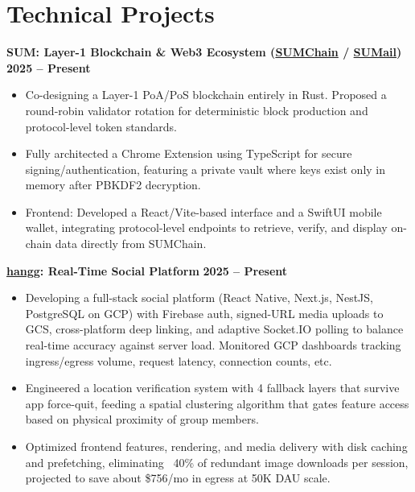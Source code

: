 \documentclass[10pt, letterpaper]{article}
\begin{document}
\section{Technical Projects}
\noindent \textbf{SUM: Layer-1 Blockchain \& Web3 Ecosystem (\href{https://sumchain.io/}{SUMChain} / \href{https://sumail.xyz/}{SUMail})} \hfill \textbf{2025 – Present}
\begin{itemize}
    \item Co-designing a Layer-1 PoA/PoS blockchain entirely in Rust. Proposed a round-robin validator rotation for deterministic block production and protocol-level token standards. 
    \item Fully architected a Chrome Extension using TypeScript for secure signing/authentication, featuring a private vault where keys exist only in memory after PBKDF2 decryption. 
    \item Frontend: Developed a React/Vite-based interface and a SwiftUI mobile wallet, integrating protocol-level endpoints to retrieve, verify, and display on-chain data directly from  SUMChain.
\end{itemize}

\noindent \textbf{\href{https://hangg.app/}{hangg}: Real-Time Social Platform} \hfill \textbf{2025 – Present}
\begin{itemize}
    \item Developing a full-stack social platform (React Native, Next.js, NestJS, PostgreSQL on GCP) with Firebase auth, signed-URL media uploads to GCS, cross-platform deep linking, and adaptive Socket.IO polling to balance real-time accuracy against server load. Monitored GCP dashboards tracking ingress/egress volume, request latency, connection counts, etc.
    \item Engineered a location verification system with 4 fallback layers that survive app force-quit, feeding a spatial clustering algorithm that gates feature access based on physical proximity of group members.
    \item Optimized frontend features, rendering, and media delivery with disk caching and prefetching, eliminating ~40\% of redundant image downloads per session, projected to save about \$756/mo in egress at 50K DAU scale.
\end{itemize}
\end{document}
